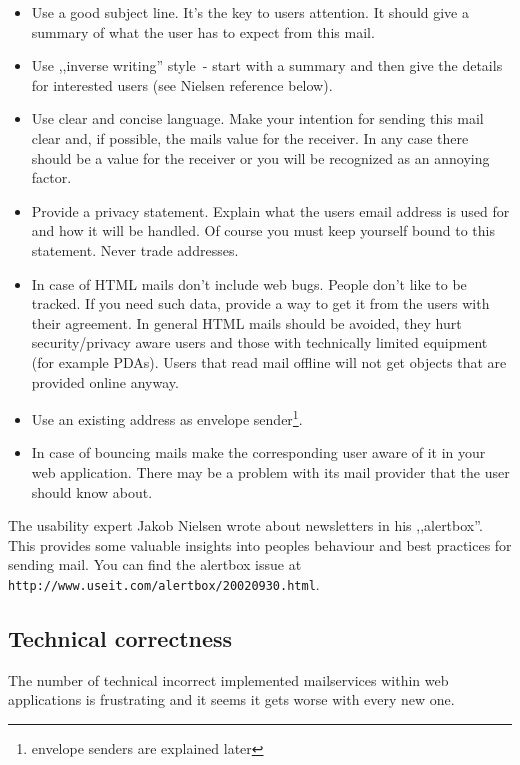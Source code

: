 \documentclass{article}
\begin{document}
\begin{itemize}
  \item Use a good subject line. It's the key to users attention. It
        should give a summary of what the user has to expect from this mail.
  \item Use ,,inverse writing'' style~- start with a summary and then
        give the details for interested users (see Nielsen reference below).
  \item Use clear and concise language. Make your intention for sending
        this mail clear and, if possible, the mails value for the receiver.
	In any case there should be a value for the receiver or you will
	be recognized as an annoying factor.
  \item Provide a privacy statement. Explain what the users email address
        is used for and how it will be handled. Of course you must keep
	yourself bound to this statement. Never trade addresses.
  \item In case of HTML mails don't include web bugs. People don't like
        to be tracked. If you need such data, provide a way to get it from
	the users with their agreement. In general HTML mails should be
	avoided, they hurt security/privacy aware users and those with
	technically limited equipment (for example PDAs). Users that read
	mail offline will not get objects that are provided online
	anyway.
  \item Use an existing address as envelope sender\footnote{envelope senders
        are explained later}.
  \item In case of bouncing mails make the corresponding user aware of it
        in your web application.
	There may be a problem with its mail provider that
	the user should know about.
\end{itemize}

The usability expert Jakob Nielsen wrote about newsletters in his
,,alertbox''. This provides some valuable
insights into peoples behaviour and best practices for sending mail.
You can find the alertbox issue at\\
\texttt{http://www.useit.com/alertbox/20020930.html}.

\subsection{Technical correctness}

The number of technical incorrect implemented mailservices within web
applications is frustrating and it seems it gets worse with every new one.
\end{document}
